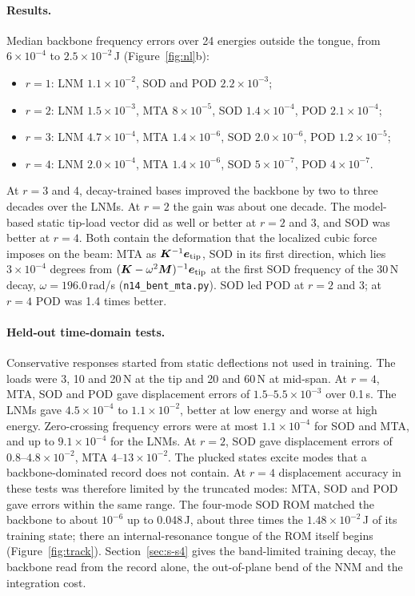 \documentclass[preprint,12pt]{elsarticle}
\begin{document}
\paragraph{Results.} Median backbone frequency errors over 24 energies outside the tongue, from $6\times10^{-4}$ to $2.5\times10^{-2}$\,J (Figure~\ref{fig:nl}b):
\begin{itemize}
\item $r=1$: LNM $1.1\times10^{-2}$, SOD and POD $2.2\times10^{-3}$;
\item $r=2$: LNM $1.5\times10^{-3}$, MTA $8\times10^{-5}$, SOD $1.4\times10^{-4}$, POD $2.1\times10^{-4}$;
\item $r=3$: LNM $4.7\times10^{-4}$, MTA $1.4\times10^{-6}$, SOD $2.0\times10^{-6}$, POD $1.2\times10^{-5}$;
\item $r=4$: LNM $2.0\times10^{-4}$, MTA $1.4\times10^{-6}$, SOD $5\times10^{-7}$, POD $4\times10^{-7}$.
\end{itemize}
At $r=3$ and 4, decay-trained bases improved the backbone by two to three decades over the LNMs. At $r=2$ the gain was about one decade. The model-based static tip-load vector did as well or better at $r=2$ and 3, and SOD was better at $r=4$.
Both contain the deformation that the localized cubic force imposes on the beam: MTA as $\bm{K}^{-1}\bm{e}_{\mathrm{tip}}$, SOD in its first direction, which lies $3\times10^{-4}$ degrees from $(\bm{K}-\omega^2\bm{M})^{-1}\bm{e}_{\mathrm{tip}}$ at the first SOD frequency of the 30\,N decay, $\omega=196.0$\,rad/s (\texttt{n14\_bent\_mta.py}).
SOD led POD at $r=2$ and 3; at $r=4$ POD was 1.4 times better.

\paragraph{Held-out time-domain tests.} Conservative responses started from static deflections not used in training. The loads were 3, 10 and 20\,N at the tip and 20 and 60\,N at mid-span.
At $r=4$, MTA, SOD and POD gave displacement errors of $1.5$--$5.5\times10^{-3}$ over 0.1\,s. The LNMs gave $4.5\times10^{-4}$ to $1.1\times10^{-2}$, better at low energy and worse at high energy. Zero-crossing frequency errors were at most $1.1\times10^{-4}$ for SOD and MTA, and up to $9.1\times10^{-4}$ for the LNMs.
At $r=2$, SOD gave displacement errors of $0.8$--$4.8\times10^{-2}$, MTA $4$--$13\times10^{-2}$.
The plucked states excite modes that a backbone-dominated record does not contain. At $r=4$ displacement accuracy in these tests was therefore limited by the truncated modes: MTA, SOD and POD gave errors within the same range.
The four-mode SOD ROM matched the backbone to about $10^{-6}$ up to 0.048\,J, about three times the $1.48\times10^{-2}$\,J of its training state; there an internal-resonance tongue of the ROM itself begins (Figure~\ref{fig:track}). Section~\ref{sec:s-s4} gives the band-limited training decay, the backbone read from the record alone, the out-of-plane bend of the NNM and the integration cost.
\end{document}
